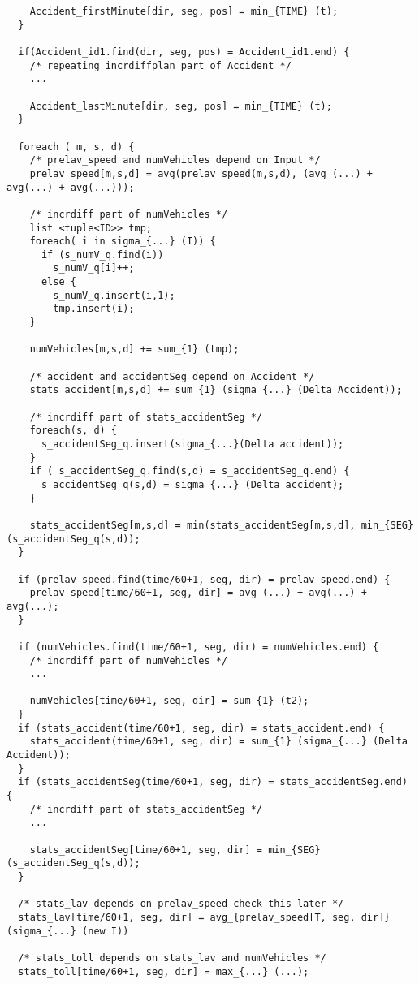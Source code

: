 \begin{verbatim}
    Accident_firstMinute[dir, seg, pos] = min_{TIME} (t);
  }

  if(Accident_id1.find(dir, seg, pos) = Accident_id1.end) {
    /* repeating incrdiffplan part of Accident */
    ...
    
    Accident_lastMinute[dir, seg, pos] = min_{TIME} (t);
  }
  
  foreach ( m, s, d) {
    /* prelav_speed and numVehicles depend on Input */
    prelav_speed[m,s,d] = avg(prelav_speed(m,s,d), (avg_(...) + avg(...) + avg(...)));
    
    /* incrdiff part of numVehicles */
    list <tuple<ID>> tmp;
    foreach( i in sigma_{...} (I)) {
      if (s_numV_q.find(i)) 
        s_numV_q[i]++;
      else {
        s_numV_q.insert(i,1);
        tmp.insert(i);
    }
    
    numVehicles[m,s,d] += sum_{1} (tmp);
    
    /* accident and accidentSeg depend on Accident */
    stats_accident[m,s,d] += sum_{1} (sigma_{...} (Delta Accident));
    
    /* incrdiff part of stats_accidentSeg */
    foreach(s, d) {
      s_accidentSeg_q.insert(sigma_{...}(Delta accident));
    }
    if ( s_accidentSeg_q.find(s,d) = s_accidentSeg_q.end) {
      s_accidentSeg_q(s,d) = sigma_{...} (Delta accident);
    }
    
    stats_accidentSeg[m,s,d] = min(stats_accidentSeg[m,s,d], min_{SEG} (s_accidentSeg_q(s,d));
  }
  
  if (prelav_speed.find(time/60+1, seg, dir) = prelav_speed.end) {
    prelav_speed[time/60+1, seg, dir] = avg_(...) + avg(...) + avg(...);
  }

  if (numVehicles.find(time/60+1, seg, dir) = numVehicles.end) {
    /* incrdiff part of numVehicles */
    ...
    
    numVehicles[time/60+1, seg, dir] = sum_{1} (t2);
  }
  if (stats_accident(time/60+1, seg, dir) = stats_accident.end) {
    stats_accident(time/60+1, seg, dir) = sum_{1} (sigma_{...} (Delta Accident));
  }
  if (stats_accidentSeg(time/60+1, seg, dir) = stats_accidentSeg.end) {
    /* incrdiff part of stats_accidentSeg */
    ...
     
    stats_accidentSeg[time/60+1, seg, dir] = min_{SEG} (s_accidentSeg_q(s,d));
  }

  /* stats_lav depends on prelav_speed check this later */
  stats_lav[time/60+1, seg, dir] = avg_{prelav_speed[T, seg, dir]} (sigma_{...} (new I))

  /* stats_toll depends on stats_lav and numVehicles */
  stats_toll[time/60+1, seg, dir] = max_{...} (...);


\end{verbatim}
